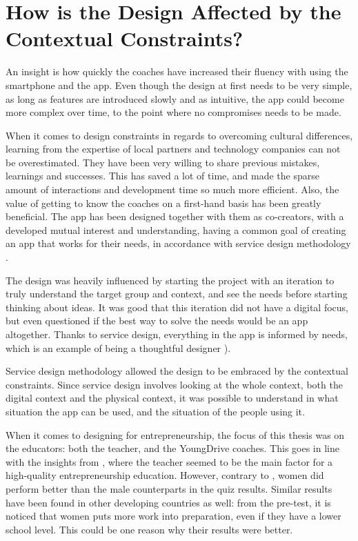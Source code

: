 
\section{How is the Design Affected by the Contextual Constraints?} %

  An insight is how quickly the coaches have increased their fluency with using the smartphone and the app. Even though the design at first needs to be very simple, as long as features are introduced slowly and as intuitive, the app could become more complex over time, to the point where no compromises needs to be made.

  When it comes to design constraints in regards to overcoming cultural differences, learning from the expertise of local partners and technology companies can not be overestimated. They have been very willing to share previous mistakes, learnings and successes. This has saved a lot of time, and made the sparse amount of interactions and development time so much more efficient. Also, the value of getting to know the coaches on a first-hand basis has been greatly beneficial. The app has been designed together with them as co-creators, with a developed mutual interest and understanding, having a common goal of creating an app that works for their needs, in accordance with service design methodology \citep{stickdorn}.

  The design was heavily influenced by starting the project with an iteration to truly understand the target group and context, and see the needs before starting thinking about ideas. It was good that this iteration did not have a digital focus, but even questioned if the best way to solve the needs would be an app altogether. Thanks to service design, everything in the app is informed by needs, which is an example of being a thoughtful designer \citep{lowgren} \citep{stickdorn}).

  Service design methodology allowed the design to be embraced by the contextual constraints. Since service design involves looking at the whole context, both the digital context and the physical context, it was possible to understand in what situation the app can be used, and the situation of the people using it.

  When it comes to designing for entrepreneurship, the focus of this thesis was on the educators: both the teacher, and the YoungDrive coaches. This goes in line with the insights from \cite{ruskovaara}, where the teacher seemed to be the main factor for a high-quality entrepreneurship education. However, contrary to \cite{ruskovaara}, women did perform better than the male counterparts in the quiz results. Similar results have been found in other developing countries as well: from the pre-test, it is noticed that women puts more work into preparation, even if they have a lower school level. This could be one reason why their results were better.


